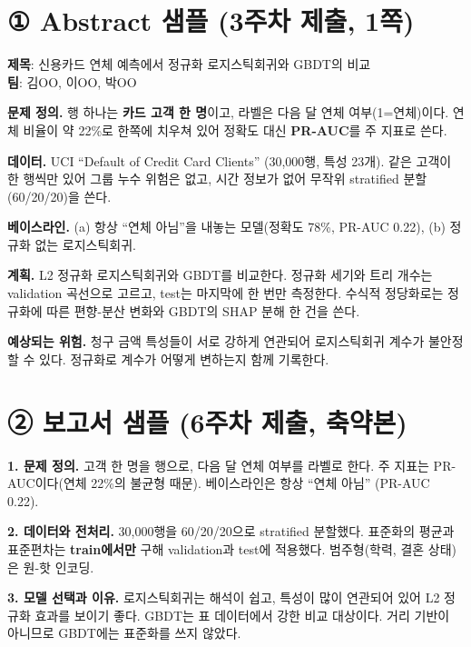 \documentclass[11pt]{article}
\begin{document}


\section*{① Abstract 샘플 (3주차 제출, 1쪽)}
\noindent\textbf{제목}: 신용카드 연체 예측에서 정규화 로지스틱회귀와 GBDT의 비교 \\
\textbf{팀}: 김OO, 이OO, 박OO

\vspace{4pt}
\noindent\textbf{문제 정의.} 행 하나는 \textbf{카드 고객 한 명}이고, 라벨은 다음 달 연체 여부(1=연체)이다. 연체 비율이 약 22\%로 한쪽에 치우쳐 있어 정확도 대신 \textbf{PR-AUC}를 주 지표로 쓴다.

\noindent\textbf{데이터.} UCI ``Default of Credit Card Clients'' (30{,}000행, 특성 23개). 같은 고객이 한 행씩만 있어 그룹 누수 위험은 없고, 시간 정보가 없어 무작위 stratified 분할(60/20/20)을 쓴다.

\noindent\textbf{베이스라인.} (a) 항상 ``연체 아님''을 내놓는 모델(정확도 78\%, PR-AUC 0.22), (b) 정규화 없는 로지스틱회귀.

\noindent\textbf{계획.} L2 정규화 로지스틱회귀와 GBDT를 비교한다. 정규화 세기와 트리 개수는 validation 곡선으로 고르고, test는 마지막에 한 번만 측정한다. 수식적 정당화로는 정규화에 따른 편향-분산 변화와 GBDT의 SHAP 분해 한 건을 쓴다.

\noindent\textbf{예상되는 위험.} 청구 금액 특성들이 서로 강하게 연관되어 로지스틱회귀 계수가 불안정할 수 있다. 정규화로 계수가 어떻게 변하는지 함께 기록한다.

\newpage
\section*{② 보고서 샘플 (6주차 제출, 축약본)}
\noindent\textbf{1. 문제 정의.} 고객 한 명을 행으로, 다음 달 연체 여부를 라벨로 한다. 주 지표는 PR-AUC이다(연체 22\%의 불균형 때문). 베이스라인은 항상 ``연체 아님'' (PR-AUC 0.22).

\noindent\textbf{2. 데이터와 전처리.} 30{,}000행을 60/20/20으로 stratified 분할했다. 표준화의 평균과 표준편차는 \textbf{train에서만} 구해 validation과 test에 적용했다. 범주형(학력, 결혼 상태)은 원-핫 인코딩.

\noindent\textbf{3. 모델 선택과 이유.} 로지스틱회귀는 해석이 쉽고, 특성이 많이 연관되어 있어 L2 정규화 효과를 보이기 좋다. GBDT는 표 데이터에서 강한 비교 대상이다. 거리 기반이 아니므로 GBDT에는 표준화를 쓰지 않았다.
\end{document}
